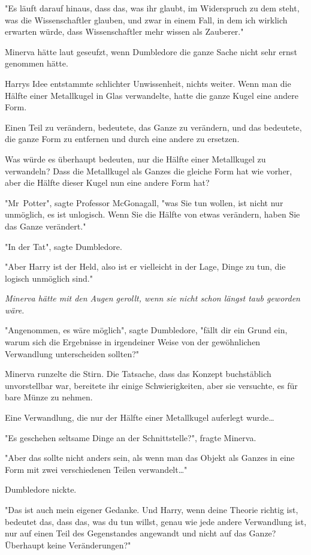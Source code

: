 {"Es läuft darauf hinaus, dass das, was ihr glaubt, im Widerspruch zu dem steht, was die Wissenschaftler glauben, und zwar in einem Fall, in dem ich wirklich erwarten würde, dass Wissenschaftler mehr wissen als Zauberer."

Minerva hätte laut geseufzt, wenn Dumbledore die ganze Sache nicht sehr ernst genommen hätte.

Harrys Idee entstammte schlichter Unwissenheit, nichts weiter. Wenn man die Hälfte einer Metallkugel in Glas verwandelte, hatte die ganze Kugel eine andere Form.

Einen Teil zu verändern, bedeutete, das Ganze zu verändern, und das bedeutete, die ganze Form zu entfernen und durch eine andere zu ersetzen.

Was würde es überhaupt bedeuten, nur die Hälfte einer Metallkugel zu verwandeln? Dass die Metallkugel als Ganzes die gleiche Form hat wie vorher, aber die Hälfte dieser Kugel nun eine andere Form hat?

"Mr~Potter", sagte Professor McGonagall, "was Sie tun wollen, ist nicht nur unmöglich, es ist unlogisch. Wenn Sie die Hälfte von etwas verändern, haben Sie das Ganze verändert."

"In der Tat", sagte Dumbledore.

"Aber Harry ist der Held, also ist er vielleicht in der Lage, Dinge zu tun, die logisch unmöglich sind."

\emph{Minerva hätte mit den Augen gerollt, wenn sie nicht schon längst taub geworden wäre.}

"Angenommen, es wäre möglich", sagte Dumbledore, "fällt dir ein Grund ein, warum sich die Ergebnisse in irgendeiner Weise von der gewöhnlichen Verwandlung unterscheiden sollten?"

Minerva runzelte die Stirn. Die Tatsache, dass das Konzept buchstäblich unvorstellbar war, bereitete ihr einige Schwierigkeiten, aber sie versuchte, es für bare Münze zu nehmen.

Eine Verwandlung, die nur der Hälfte einer Metallkugel auferlegt wurde…

"Es geschehen seltsame Dinge an der Schnittstelle?", fragte Minerva.

"Aber das sollte nicht anders sein, als wenn man das Objekt als Ganzes in eine Form mit zwei verschiedenen Teilen verwandelt…"

Dumbledore nickte.

"Das ist auch mein eigener Gedanke. Und Harry, wenn deine Theorie richtig ist, bedeutet das, dass das, was du tun willst, genau wie jede andere Verwandlung ist, nur auf einen Teil des Gegenstandes angewandt und nicht auf das Ganze? Überhaupt keine Veränderungen?"

}
